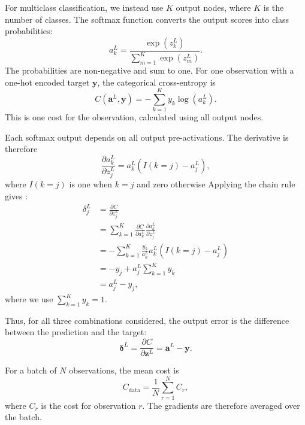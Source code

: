 \documentclass[amssymb,secnumarabic,twocolumn,aps]{revtex4}
\begin{document}
For multiclass classification, we instead use $K$ output nodes, where $K$ is the number of classes. The softmax function converts the output scores into class probabilities:
\begin{equation*}
    a_k^L
    = \frac{\exp(z_k^L)}
    {\sum_{m=1}^{K}\exp(z_m^L)}.
\end{equation*}
The probabilities are non-negative and sum to one. For one observation with a one-hot encoded target $\boldsymbol{y}$, the categorical cross-entropy is
\begin{equation*}
    C(\boldsymbol{a}^L,\boldsymbol{y})
    = -\sum_{k=1}^{K}y_k\log(a_k^L).
\end{equation*}
This is one cost for the observation, calculated using all output nodes.

Each softmax output depends on all output pre-activations. The derivative is therefore
\begin{equation*}
    \frac{\partial a_k^L}{\partial z_j^L}
    = a_k^L\left(I(k=j)-a_j^L\right),
\end{equation*}
where $I(k=j)$ is one when $k=j$ and zero otherwise Applying the chain rule gives \cite{mehta2023softmax}:
\begin{align*}
    \delta_j^L
     & = \frac{\partial C}{\partial z_j^L} \\
     & = \sum_{k=1}^{K}
    \frac{\partial C}{\partial a_k^L}
    \frac{\partial a_k^L}{\partial z_j^L}  \\
     & = -\sum_{k=1}^{K}
    \frac{y_k}{a_k^L}
    a_k^L\left(I(k=j)-a_j^L\right)         \\
     & = -y_j+a_j^L\sum_{k=1}^{K}y_k       \\
     & = a_j^L-y_j,
\end{align*}
where we use $\sum_{k=1}^{K}y_k=1$.

Thus, for all three combinations considered, the output error is the difference between the prediction and the target:
\begin{equation}
    \boldsymbol{\delta}^L
    = \frac{\partial C}{\partial\boldsymbol{z}^L}
    = \boldsymbol{a}^L-\boldsymbol{y}.
\end{equation}

For a batch of $N$ observations, the mean cost is
\begin{equation*}
    C_{\mathrm{data}}
    = \frac{1}{N}\sum_{r=1}^{N}C_r,
\end{equation*}
where $C_r$ is the cost for observation $r$. The gradients are therefore averaged over the batch.
\end{document}
